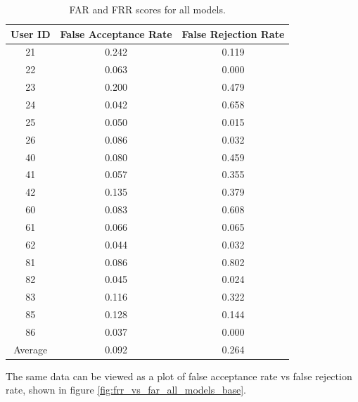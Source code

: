 \begin{center}
\begin{table}[H]
\begin{center}
	\begin{tabular}{ |c|c|c| } 
		\hline
		User ID & False Acceptance Rate & False Rejection Rate \\
		\hline
		21 & 0.242 & 0.119 \\
		\hline
		22 & 0.063 & 0.000 \\
		\hline
		23 & 0.200 & 0.479 \\
		\hline
		24 & 0.042 & 0.658 \\
		\hline
		25 & 0.050 & 0.015 \\
		\hline
		26 & 0.086 & 0.032 \\
		\hline
		40 & 0.080 & 0.459 \\
		\hline
		41 & 0.057 & 0.355 \\
		\hline
		42 & 0.135 & 0.379 \\
		\hline
		60 & 0.083 & 0.608 \\
		\hline
		61 & 0.066 & 0.065 \\
		\hline
		62 & 0.044 & 0.032 \\
		\hline
		81 & 0.086 & 0.802 \\
		\hline
		82 & 0.045 & 0.024 \\
		\hline
		83 & 0.116 & 0.322 \\
		\hline
		85 & 0.128 & 0.144 \\
		\hline
		86 & 0.037 & 0.000 \\
		\hline
		\hline
		Average & 0.092 & 0.264 \\
		\hline
	\end{tabular}
\end{center}
\caption{FAR and FRR scores for all models.}
\label{table:FAR_FRR_base}
\end{table}
\end{center}

The same data can be viewed as a plot of false acceptance rate vs false rejection rate, shown in figure \ref{fig:frr_vs_far_all_models_base}. 

